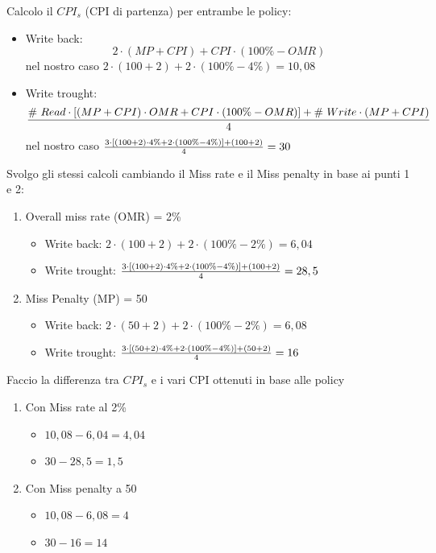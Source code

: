 \documentclass[12pt,a4paper]{article}
\begin{document}
\SmallSep \noindent
Calcolo il $CPI_s$ (CPI di partenza) per entrambe le policy:
\begin{itemize}
\item Write back: $$2\cdot(MP + CPI) + CPI \cdot(100\% - OMR)$$ nel nostro caso $2\cdot (100+2)+2\cdot(100\% - 4\%)=10,08$
\item Write trought: $${\# \ Read\cdot[(MP + CPI)\cdot OMR + CPI \cdot(100\%- OMR)] + \#\ Write\cdot (MP + CPI)\over 4}$$ nel nostro caso ${3\cdot[(100 + 2)\cdot 4\% + 2 \cdot(100\%- 4\%)] + (100 + 2)\over 4} = 30$
\end{itemize}
Svolgo gli stessi calcoli cambiando il Miss rate e il Miss penalty in base ai punti 1 e 2:
\begin{enumerate}
\item Overall miss rate (OMR) = 2\%
\begin{itemize}
\item Write back: $2\cdot (100+2)+2\cdot(100\% - 2\%)=6,04$
\item Write trought: ${3\cdot[(100 + 2)\cdot 4\% + 2 \cdot(100\%- 4\%)] + (100 + 2)\over 4} = 28,5$
\end{itemize}
\item Miss Penalty (MP) = 50
\begin{itemize}
\item Write back: $2\cdot (50+2)+2\cdot(100\% - 2\%)=6,08$
\item Write trought: ${3\cdot[(50 + 2)\cdot 4\% + 2 \cdot(100\%- 4\%)] + (50 + 2)\over 4} = 16$
\end{itemize}
\end{enumerate}
Faccio la differenza tra $CPI_s$ e i vari CPI ottenuti in base alle policy
\begin{enumerate}
\item Con Miss rate al 2\%
\begin{itemize}
\item $10,08 - 6,04 = 4,04$
\item $30-28,5 = 1,5$
\end{itemize}
\item Con Miss penalty a 50
\begin{itemize}
\item $10,08 - 6,08 = 4$
\item $30-16 = 14$
\end{itemize}
\end{enumerate}
\end{document}
